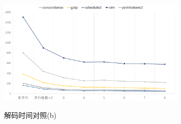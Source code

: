 \begin{figure}[!htb]
  \centering
  \includegraphics[width=0.8\textwidth]
  {figures/decode-time2.pdf}\\
  \caption{解码时间对照(b)}
  \label{fig:decode-time2}
\end{figure}



